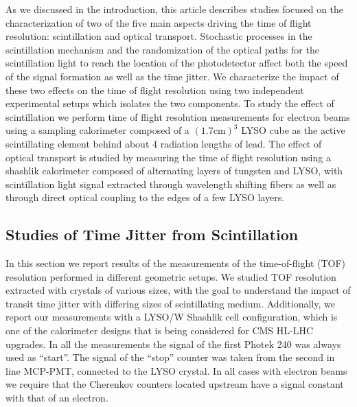 \documentclass[11pt]{article}
\begin{document}
As we discussed in the introduction, this article describes studies
focused on the characterization of two of the five main aspects
driving the time of flight resolution: scintillation and 
optical transport. Stochastic processes in the scintillation
mechanism and the randomization of the optical paths for the 
scintillation light to reach the location of the photodetector 
affect both the speed of the signal formation
as well as the time jitter. We characterize the impact of
these two effects on the time of flight resolution using
two independent experimental setups which isolates the
two components. To study the effect of scintillation
we perform time of flight resolution measurements
for electron beams using a sampling calorimeter composed of a 
$(1.7\mathrm{ cm})^{3}$ LYSO cube as the active 
scintillating element behind about 4 radiation lengths of lead. 
The effect of optical transport is studied by measuring
the time of flight resolution using a shashlik 
calorimeter composed of alternating layers of tungsten
and LYSO, with scintillation light signal extracted
through wavelength shifting fibers as well as 
through direct optical coupling to the edges of a few
LYSO layers. 


\subsection{Studies of Time Jitter from Scintillation}


In this section we report results of the
measurements of the time-of-flight (TOF) resolution performed in different
geometric setups. We studied TOF resolution extracted with crystals of various
sizes, with the goal to understand the impact of transit time jitter with
differing sizes of scintillating medium. Additionally, we report our
measurements with a LYSO/W Shashlik cell configuration, which is one of the
calorimeter designs that is being considered for CMS HL-LHC upgrades. In all the
measurements the signal of the first Photek 240 was always used as ``start''.
The signal of the ``stop'' counter was taken from the second in line MCP-PMT,
connected to the LYSO crystal. In all cases with electron beams we require that
the Cherenkov counters located upstream have a signal constant with that of an
electron. 
\end{document}
